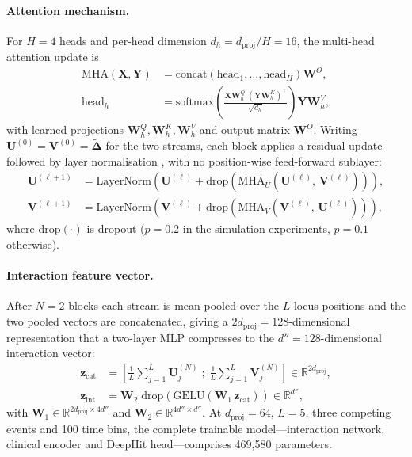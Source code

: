 \documentclass[11pt,a4paper]{article}
\begin{document}
\paragraph{Attention mechanism.}
For $H = 4$ heads and per-head dimension $d_h = d_{\mathrm{proj}} / H = 16$,
the multi-head attention update is
\begin{align}
  \mathrm{MHA}(\mathbf{X}, \mathbf{Y})
    &= \mathrm{concat}\!\left(\mathrm{head}_1, \ldots, \mathrm{head}_H\right)
       \mathbf{W}^O,
  \label{eq:mha} \\
  \mathrm{head}_h
    &= \mathrm{softmax}\!\left(
        \frac{\mathbf{X}\mathbf{W}^Q_h \;
              (\mathbf{Y}\mathbf{W}^K_h)^\top}{\sqrt{d_h}}
       \right)
       \mathbf{Y}\mathbf{W}^V_h,
  \label{eq:attn}
\end{align}
with learned projections $\mathbf{W}^Q_h, \mathbf{W}^K_h, \mathbf{W}^V_h$ and
output matrix $\mathbf{W}^O$.  Writing $\mathbf{U}^{(0)} = \mathbf{V}^{(0)} =
\tilde{\boldsymbol{\Delta}}$ for the two streams, each block applies a
residual update followed by layer normalisation \citep{ba2016layernorm}, with
no position-wise feed-forward sublayer:
\begin{align}
  \mathbf{U}^{(\ell+1)}
    &= \mathrm{LayerNorm}\!\left(\mathbf{U}^{(\ell)}
       + \mathrm{drop}\!\left(\mathrm{MHA}_U(\mathbf{U}^{(\ell)},\,
                      \mathbf{V}^{(\ell)})\right)\right),
  \label{eq:xattn_d} \\
  \mathbf{V}^{(\ell+1)}
    &= \mathrm{LayerNorm}\!\left(\mathbf{V}^{(\ell)}
       + \mathrm{drop}\!\left(\mathrm{MHA}_V(\mathbf{V}^{(\ell)},\,
                      \mathbf{U}^{(\ell)})\right)\right),
  \label{eq:xattn_r}
\end{align}
where $\mathrm{drop}(\cdot)$ is dropout ($p = 0.2$ in the simulation
experiments, $p = 0.1$ otherwise).

\paragraph{Interaction feature vector.}
After $N = 2$ blocks each stream is mean-pooled over the $L$ locus positions
and the two pooled vectors are concatenated, giving a
$2 d_{\mathrm{proj}} = 128$-dimensional representation that a two-layer MLP
compresses to the $d'' = 128$-dimensional interaction vector:
\begin{align}
  \mathbf{z}_{\mathrm{cat}}
    &= \left[\frac{1}{L}\sum_{j=1}^{L} \mathbf{U}^{(N)}_j \;;\;
             \frac{1}{L}\sum_{j=1}^{L} \mathbf{V}^{(N)}_j\right]
    \in \mathbb{R}^{2 d_{\mathrm{proj}}}, \label{eq:zcat}\\
  \mathbf{z}_{\mathrm{int}}
    &= \mathbf{W}_2\;\mathrm{drop}\!\left(\mathrm{GELU}\!\left(
         \mathbf{W}_1\,\mathbf{z}_{\mathrm{cat}}\right)\right)
    \in \mathbb{R}^{d''},  \label{eq:zint}
\end{align}
with $\mathbf{W}_1 \in \mathbb{R}^{2 d_{\mathrm{proj}} \times 4d''}$ and
$\mathbf{W}_2 \in \mathbb{R}^{4d'' \times d''}$.  At $d_{\mathrm{proj}} = 64$,
$L = 5$, three competing events and 100 time bins, the complete trainable
model---interaction network, clinical encoder and DeepHit head---comprises
469{,}580 parameters.
\end{document}
